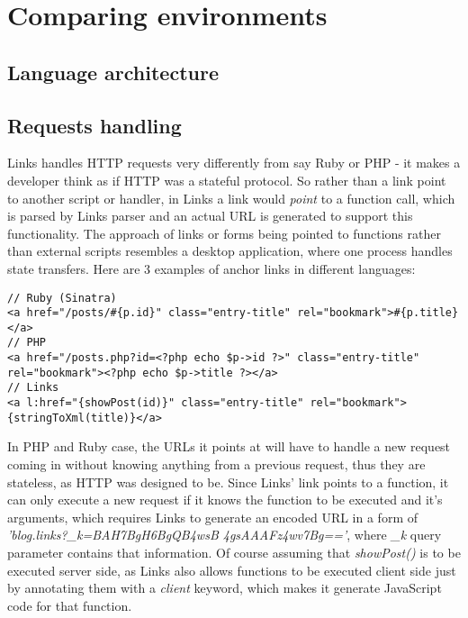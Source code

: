 
\chapter{Comparing environments}

\section{Language architecture}

\section{Requests handling}

Links handles HTTP requests very differently from say Ruby or PHP - it makes a developer think as if HTTP was a stateful protocol. So rather than a link point to another script or handler, in Links a link would \textit{point} to a function call, which is parsed by Links parser and an actual URL is generated to support this functionality. The approach of links or forms being pointed to functions rather than external scripts resembles a desktop application, where one process handles state transfers. Here are 3 examples of anchor links in different languages:

\begin{codelisting}
\begin{verbatim}
// Ruby (Sinatra)
<a href="/posts/#{p.id}" class="entry-title" rel="bookmark">#{p.title}</a>
// PHP
<a href="/posts.php?id=<?php echo $p->id ?>" class="entry-title" rel="bookmark"><?php echo $p->title ?></a>
// Links
<a l:href="{showPost(id)}" class="entry-title" rel="bookmark">{stringToXml(title)}</a>
\end{verbatim}
\end{codelisting}

In PHP and Ruby case, the URLs it points at will have to handle a new request coming in without knowing anything from a previous request, thus they are stateless, as HTTP was designed to be. Since Links' link points to a function, it can only execute a new request if it knows the function to be executed and it's arguments, which requires Links to generate an encoded URL in a form of \textit{'blog.links?\_k=BAH7BgH6BgQB4wsB 4gsAAAFz4wv7Bg=='}, where \textit{\_k} query parameter contains that information. Of course assuming that \textit{showPost()} is to be executed server side, as Links also allows functions to be executed client side just by annotating them with a \textit{client} keyword, which makes it generate JavaScript code for that function.

